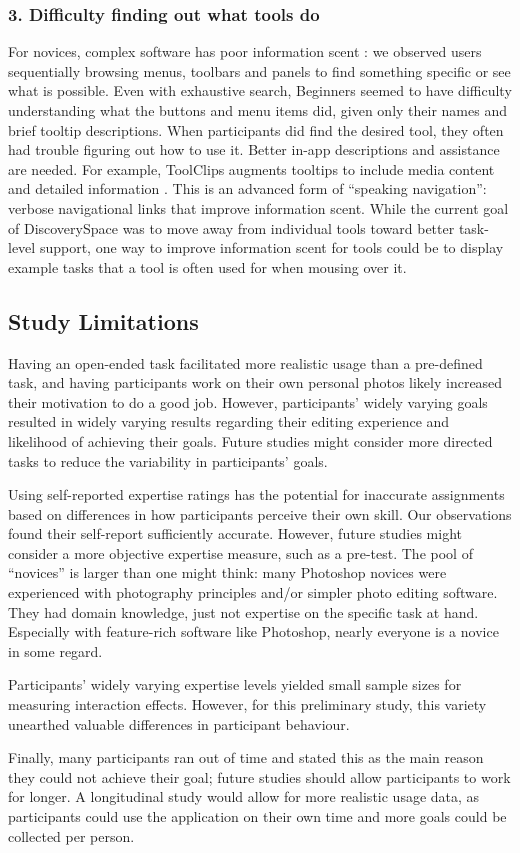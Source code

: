 \subsubsection{3. Difficulty finding out what tools do}
For novices, complex software has poor information scent \cite{Pirolli2003}: we observed users sequentially browsing menus, toolbars and panels to find something specific or see what is possible. Even with exhaustive search, Beginners seemed to have difficulty understanding what the buttons and menu items did, given only their names and brief tooltip descriptions. When participants did find the desired tool, they often had trouble figuring out how to use it. Better in-app descriptions and assistance are needed. For example, ToolClips augments tooltips to include media content and detailed information \cite{Grossman2010a}. This is an advanced form of ``speaking navigation'': verbose navigational links that improve information scent. While the current goal of Discovery\-Space was to move away from individual tools toward better task-level support, one way to improve information scent for tools could be to display example tasks that a tool is often used for when mousing over it.

\subsection{Study Limitations}
Having an open-ended task facilitated more realistic usage than a pre-defined task, and having participants work on their own personal photos likely increased their motivation to do a good job. However, participants' widely varying goals resulted in widely varying results regarding their editing experience and likelihood of achieving their goals. Future studies might consider more directed tasks to reduce the variability in participants' goals. 

Using self-reported expertise ratings has the potential for inaccurate assignments based on differences in how participants perceive their own skill. Our observations found their self-report sufficiently accurate. However, future studies might consider a more objective expertise measure, such as a pre-test. The pool of ``novices'' is larger than one might think: many Photoshop novices were experienced with photography principles and/or simpler photo editing software. They had domain knowledge, just not expertise on the specific task at hand. Especially with feature-rich software like Photoshop, nearly everyone is a novice in some regard. 

Participants' widely varying expertise levels yielded small sample sizes for measuring interaction effects. However, for this preliminary study, this variety unearthed valuable differences in participant behaviour. 

Finally, many participants ran out of time and stated this as the main reason they could not achieve their goal; future studies should allow participants to work for longer. A longitudinal study would allow for more realistic usage data, as participants could use the application on their own time and more goals could be collected per person. 
